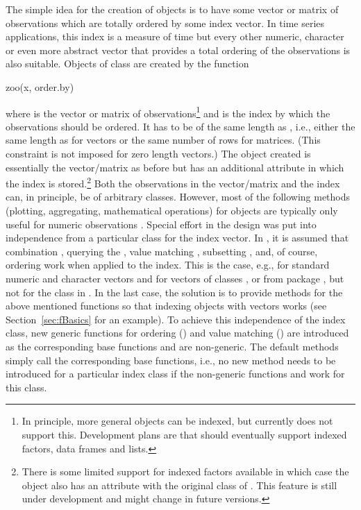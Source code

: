 \documentclass{Z}
\begin{document}
The simple idea for the creation of  objects is to have
some vector or matrix of observations  which are totally ordered
by some index vector. In time series applications, this index is a measure of
time but every other numeric, character or even more abstract vector that
provides a total ordering of the observations is also suitable. Objects
of class  are created by the function
\begin{Scode}
zoo(x, order.by)
\end{Scode}
where  is the vector or matrix of observations\footnote{In principle,
more general objects can be indexed, but currently  does not support this.
Development plans are that  should eventually support indexed factors,
data frames and lists.} and 
is the index by which the observations should be ordered. It has to be
of the same length as , i.e., either the same length as 
for vectors or the same number of rows for matrices. (This constraint is
not imposed for zero length vectors.)   The  object
created is essentially the vector/matrix as before but has an additional
 attribute in which the index is stored.\footnote{There is some
limited support for indexed factors available in which case the 
object also has an attribute  with the original class
of . This feature is still under development and might change in future
versions.} Both the observations in the vector/matrix 
and the index  can, in principle, be of arbitrary classes. However, most of the
following methods (plotting, aggregating, mathematical operations) for 
objects are typically only useful for numeric observations . Special
effort in the design was put into independence from a particular class for
the index vector. In , it is assumed that combination ,
querying the , value matching , subsetting \code{[,},
and, of course, ordering  work when applied to the index. 
This is the case, e.g., for standard numeric and character vectors and for
vectors of classes ,  or 
from package , but not for the class  in .
In the last case, the solution is to provide methods for the above mentioned
functions so that indexing  objects with  vectors works
(see Section~\ref{sec:fBasics} for an example).
To achieve this  independence of the index class, new generic functions for
ordering () and value matching () are introduced
as the corresponding base functions  and  are 
non-generic. The default methods simply call the corresponding base functions, i.e.,
no new method needs to be introduced for a particular index class if the 
non-generic functions  and  work for this class.
\end{document}
